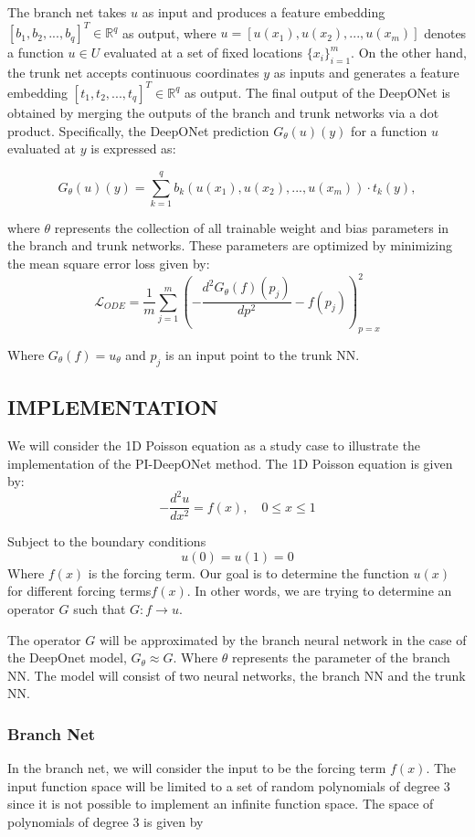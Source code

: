 \documentclass[a4paper,12pt]{article}
\theoremstyle{definition}
\begin{document}
The branch net takes $u$ as input and produces a feature embedding $[b_1, b_2, ..., b_q]^T \in \mathbb{R}^q$
as output, where $u = [u(x_1), u(x_2), ..., u(x_m)]$ denotes a function $u \in U$ evaluated at a set of 
fixed locations $\{x_i\}_{i=1}^m$. On the other hand, the trunk net accepts continuous coordinates $y$ as
inputs and generates a feature embedding $[t_1, t_2, ..., t_q]^T \in \mathbb{R}^q$ as output. The final 
output of the DeepONet is obtained by merging the outputs of the branch and trunk networks via a dot 
product. Specifically, the DeepONet prediction $G_{\theta}(u)(y)$ for a function $u$ evaluated at $y$
is expressed as:

\begin{equation}
G_{\theta}(u)(y) = \sum_{k=1}^{q} b_k(u(x_1), u(x_2), ..., u(x_m)) \cdot t_k(y),
\end{equation}

where $\theta$ represents the collection of all trainable weight and bias parameters in the branch and trunk networks. 
These parameters are optimized by minimizing the mean square error loss given by:
$$
\mathcal{L}_{ODE} = \frac{1}{m} \sum_{j=1}^{m}
\left(
-\frac{d^2 G_{\theta}(f)(p_j)}{dp^2} - f(p_j)
\right)^2_{p=x}
$$

Where $G_{\theta}(f)=u_{\theta}$ and $p_j$ is an input point to the trunk NN.

\subsection{IMPLEMENTATION}
We will consider the 1D Poisson equation as a study case to 
illustrate the implementation of the PI-DeepONet method. The 1D Poisson equation is given by:
$$
-\frac{d^2 u}{d x^2} = f(x), \quad 0 \le x \le 1
$$

Subject to the boundary conditions
$$
u(0) = u(1) = 0
$$
Where $f(x)$ is the forcing term. Our goal is to determine the function $u(x)$ for different
forcing terms$f(x)$. In other words, we are trying to determine an
operator $G$ such that $G:f \rightarrow u$.

The operator $G$ will be approximated by the branch neural network in the case of
the DeepOnet model, $G_{\theta} \approx G$. Where $\theta$ represents the parameter 
of the branch NN.
The model will consist of two neural networks, the branch NN and the trunk NN. 

\subsubsection{Branch Net}
In the branch net, we will consider the input to be the forcing term $f(x)$.
The input function space will be limited to a set of random polynomials of degree 3 
since it is not possible to implement an infinite function space. The space of polynomials
of degree 3 is given by 
\end{document}
